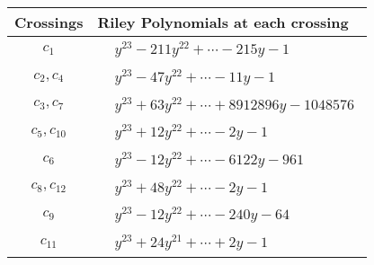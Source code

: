 \documentclass[1p]{elsarticle_modified}
\theoremstyle{definition}
\begin{document}
\begin{tabular}{m{50pt}|m{274pt}}
Crossings & \hspace{64pt}Riley Polynomials at each crossing \\
\hline $$\begin{aligned}c_{1}\end{aligned}$$&$\begin{aligned}
&y^{23}-211 y^{22}+\cdots-215 y-1
\end{aligned}$\\
\hline $$\begin{aligned}c_{2},c_{4}\end{aligned}$$&$\begin{aligned}
&y^{23}-47 y^{22}+\cdots-11 y-1
\end{aligned}$\\
\hline $$\begin{aligned}c_{3},c_{7}\end{aligned}$$&$\begin{aligned}
&y^{23}+63 y^{22}+\cdots+8912896 y-1048576
\end{aligned}$\\
\hline $$\begin{aligned}c_{5},c_{10}\end{aligned}$$&$\begin{aligned}
&y^{23}+12 y^{22}+\cdots-2 y-1
\end{aligned}$\\
\hline $$\begin{aligned}c_{6}\end{aligned}$$&$\begin{aligned}
&y^{23}-12 y^{22}+\cdots-6122 y-961
\end{aligned}$\\
\hline $$\begin{aligned}c_{8},c_{12}\end{aligned}$$&$\begin{aligned}
&y^{23}+48 y^{22}+\cdots-2 y-1
\end{aligned}$\\
\hline $$\begin{aligned}c_{9}\end{aligned}$$&$\begin{aligned}
&y^{23}-12 y^{22}+\cdots-240 y-64
\end{aligned}$\\
\hline $$\begin{aligned}c_{11}\end{aligned}$$&$\begin{aligned}
&y^{23}+24 y^{21}+\cdots+2 y-1
\end{aligned}$\\
\hline
\end{tabular}\\~\\
\end{document}
